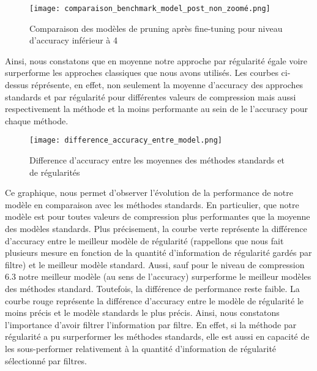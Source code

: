 \documentclass[12pt,a4paper]{article}
\begin{document}
\begin{figure}[H] %
    \centering    %
    \texttt{[image: comparaison\_benchmark\_model\_post\_non\_zoomé.png]} %
    \caption{Comparaison des modèles de pruning après fine-tuning pour niveau d'accuracy inférieur à 4} %
    \label{fig:mon_image} %
\end{figure}
Ainsi, nous constatons que en moyenne notre approche par régularité égale voire surperforme les approches classiques que nous avons utilisés. 
Les courbes ci-dessus réprésente, en effet, non seulement la moyenne d'accuracy des approches standards et par régularité pour différentes valeurs de compression mais aussi respectivement la méthode et la moins performante au sein de le l'accuracy pour chaque méthode. 
\begin{figure}[H] %
    \centering    %
    \texttt{[image: difference\_accuracy\_entre\_model.png]} %
    \caption{Difference d'accuracy entre les moyennes des méthodes standards et de régularités} %
    \label{fig:mon_image} %
\end{figure}
Ce graphique, nous permet d'observer l'évolution de la performance de notre modèle en comparaison avec les méthodes standards. 
En particulier, que notre modèle est pour toutes valeurs de compression plus performantes que la moyenne des modèles standards. Plus précisement, la courbe verte représente la différence d'accuracy entre le meilleur modèle de régularité (rappellons que nous fait plusieurs mesure en fonction de la quantité d'information de régularité gardés par filtre) et le meilleur modèle standard. 
Aussi, sauf pour le niveau de compression 6.3 notre meilleur modèle (au sens de l'accuracy) surperforme le meilleur modèles des méthodes standard. Toutefois, la différence de performance reste faible. La courbe rouge représente la différence d'accuracy entre le modèle de régularité le moins précis et le modèle standards le plus précis. Ainsi, nous constatons l'importance d'avoir filtrer l'information par filtre. En effet, si la méthode par régularité a pu surperformer les méthodes standards, elle est aussi en capacité de les sous-performer relativement à la quantité d'information de régularité sélectionné par filtres. 
\end{document}
